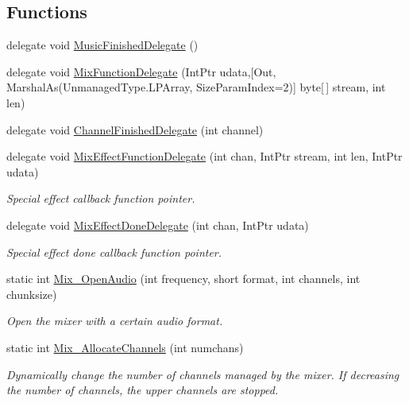 \subsection*{Functions}
\begin{DoxyCompactItemize}
\item 
delegate void \hyperlink{namespace_tao_1_1_sdl_a77c07156c43c45bdb25a74fc5afcc8b4}{MusicFinishedDelegate} ()
\item 
delegate void \hyperlink{namespace_tao_1_1_sdl_ab83026a016aa99a8271f3f01f9422a33}{MixFunctionDelegate} (IntPtr udata,\mbox{[}Out, MarshalAs(UnmanagedType.LPArray, SizeParamIndex=2)\mbox{]} byte\mbox{[}$\,$\mbox{]} stream, int len)
\item 
delegate void \hyperlink{namespace_tao_1_1_sdl_ab155f99d4b8836b2d89472492ca12921}{ChannelFinishedDelegate} (int channel)
\item 
delegate void \hyperlink{namespace_tao_1_1_sdl_a58e54c03e60d80609b443c76e184f6bf}{MixEffectFunctionDelegate} (int chan, IntPtr stream, int len, IntPtr udata)
\begin{DoxyCompactList}\small\item\em Special effect callback function pointer. \item\end{DoxyCompactList}\item 
delegate void \hyperlink{namespace_tao_1_1_sdl_a94ad2f6c0c4bd02bcac225d34ca540e6}{MixEffectDoneDelegate} (int chan, IntPtr udata)
\begin{DoxyCompactList}\small\item\em Special effect done callback function pointer. \item\end{DoxyCompactList}\item 
static int \hyperlink{namespace_tao_1_1_sdl_a71bc62050441b9475497ee931e557fd5}{Mix\_\-OpenAudio} (int frequency, short format, int channels, int chunksize)
\begin{DoxyCompactList}\small\item\em Open the mixer with a certain audio format. \item\end{DoxyCompactList}\item 
static int \hyperlink{namespace_tao_1_1_sdl_adf6a87a08d3da36a6700c817c578badf}{Mix\_\-AllocateChannels} (int numchans)
\begin{DoxyCompactList}\small\item\em Dynamically change the number of channels managed by the mixer. If decreasing the number of channels, the upper channels are stopped. \item\end{DoxyCompactList}\item 

\end{DoxyCompactItemize}
